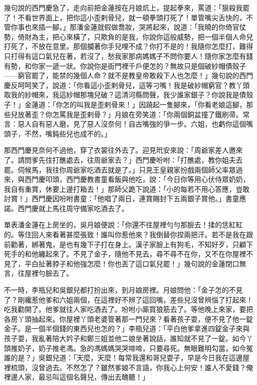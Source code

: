 幾句說的西門慶急了，走向前把金蓮按在月娘炕上，提起拳來，罵道：「狠殺我罷了！不看世界面上，把你這小歪剌骨兒，就一頓拳頭打死了！單管嘴尖舌快的，不管你事也來插一腳。」那潘金蓮就假做喬妝，哭將起來，說道：「我曉的你倚官仗勢，倚財為主，把心來橫了，只欺負的是我，你說你這般威勢，把一個半個人命兒打死了，不放在意里。那個攔著你手兒哩不成？你打不是的！我隨你怎麼打，難得只打得有這口氣兒在著，若沒了，愁我家那病媽媽子不問你要人！隨你家怎麼有錢有勢，和你家一遞一狀。你說你是衙門裡千戶便怎的？無故只是個破紗帽債殼子——窮官罷了，能禁的幾個人命？就不是教皇帝敢殺下人也怎麼！」幾句說的西門慶反呵呵笑了，說道：「你看這小歪剌骨兒，這等刁嘴！我是破紗帽窮官？教丫頭取我的紗帽來，我這紗帽那塊兒破？這清河縣問聲，我少誰家銀子？你說我是債殼子！」金蓮道：「你怎的叫我是歪剌骨來！」因蹺起一隻腳來，「你看老娘這腳，那些兒放著歪？你怎罵我是歪剌骨？」月娘在旁笑道：「你兩個銅盆撞了鐵刷帚。常言：惡人自有惡人磨，見了惡人沒奈何！自古嘴強的爭一步。六姐，也虧你這個嘴頭子，不然，嘴鈍些兒也成不的。」

那西門慶見奈何不過他，穿了衣裳往外去了。迎見玳安來說：「周爺家差人邀來了。請問爹先往打醮處去，往周爺家去？」西門慶吩咐：「打醮處，教你姐夫去罷。伺候馬，我往你周爺家吃酒去就是了。」只見王皇親家扮戲兩個師父率眾過來，與西門慶叩頭，西門慶教書童看飯與他吃，說：「今日你等用心伏侍眾奶奶，我自有重賞，休要上邊打箱去！」那師父跪下說道：「小的每若不用心答應，豈敢討賞！」西門慶因吩咐書童：「他唱了兩日，連賞賜封下五兩銀子賞他。」書童應諾。西門慶就上馬往周守備家吃酒去了。

單表潘金蓮在上房坐的，吳月娘便說：「你還不往屋裡勻勻那臉去！揉的恁紅紅的。等住回人來看著甚麼張致！誰叫你惹他來？我倒替你捏兩把汗。若不是我在跟前勸著，綁著鬼，是也有幾下子打在身上。漢子家臉上有狗毛，不知好歹，只顧下死手的和他纏起來了。不見了金子，隨他不見去，尋不尋不在你，又不在你屋裡不見了，平白扯著脖子和他強怎麼！你也丟了這口氣兒罷！」幾句說的金蓮閉口無言，往屋裡勻臉去了。

不一時，李瓶兒和吳銀兒都打扮出來，到月娘房裡。月娘問他：「金子怎的不見了？剛纔惹他爹和六姐兩個，在這裡好不辨了這回嘴，差些兒沒曾辨惱了打起來！吃我勸開了。他爹就往人家吃酒去了。吩咐小廝買狼筋去了。等他晚上來家，要把各房丫頭抽起來。你屋裡丫頭老婆管著那一門兒來？看著孩子耍，便不見了他一錠金子。是一個半個錢的東西兒也怎的？」李瓶兒道：「平白他爹拿進四錠金子來與孩子耍，我亂著陪大妗子和鄭三姐並他二娘坐著說話，誰知就不見了一錠。如今丫頭推奶子，奶子推老馮。急的馮媽媽哭哭啼啼，只要尋死。無眼難明勾當，如今冤誰的是？」吳銀兒道：「天麼，天麼！每常我還和哥兒耍子，早是今日我在這邊屋裡梳頭，沒曾過去。不然怎了？雖然爹娘不言語，你我心上何安！誰人不愛錢？俺裡邊人家，最忌叫這個名聲兒，傳出去醜聽！」

